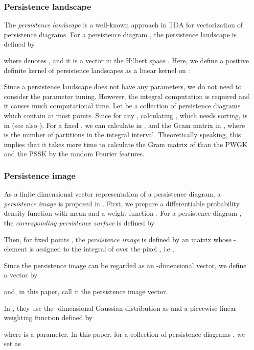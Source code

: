 \documentclass{article}
\begin{document}
\subsubsection{Persistence landscape}
\label{subsubsec:pl}
The {\em persistence landscape} \cite{Bu15} is a well-known approach in TDA for vectorization of persistence diagrams.
For a persistence diagram , the persistence landscape  is defined by

where  denotes , and it is a vector in the Hilbert space .
Here, we define a positive definite kernel of persistence landscapes as a linear kernel on :

Since a persistence landscape does not have any parameters, we do not need to consider the parameter tuning.
However, the integral computation is required and it causes much computational time.
Let  be a collection of persistence diagrams which contain at most  points.
Since  for any , calculating , which needs sorting, is in  (see also \cite{BD17}).
For a fixed , we can calculate  in , and the Gram matrix  in , where  is the number of partitions in the integral interval.
Theoretically speaking, this implies that it takes more time to calculate the Gram matrix of  than the PWGK and the PSSK by the random Fourier features.


\subsubsection{Persistence image}
\label{subsubsec:pi}
As a finite dimensional vector representation of a persistence diagram, a {\em persistence image} is proposed in \cite{AEKNPSCHMZ17}.
First, we prepare a differentiable probability density function  with mean  and a weight function . For a persistence diagram , the {\em corresponding persistence surface} is defined by

Then, for fixed points , the {\em persistence image}  is defined by an  matrix whose -element is assigned to the integral of  over the pixel , i.e., 

Since the persistence image can be regarded as an -dimensional vector, we define a vector  by

and, in this paper, call it the persistence image vector.

In \cite{AEKNPSCHMZ17}, they use the -dimensional Gaussian distribution  as  and a piecewise linear weighting function  defined by

where  is a parameter.
In this paper, for a collection of persistence diagrams , we set  as 
\end{document}
